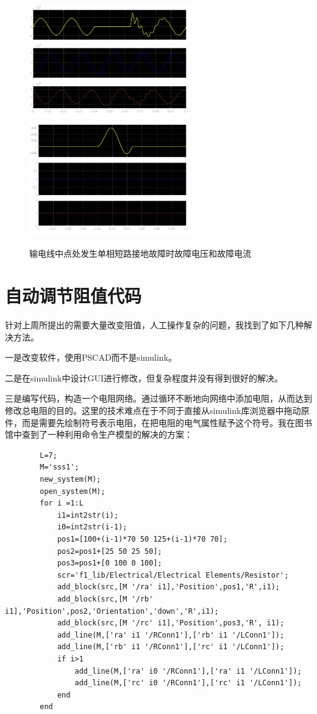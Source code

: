 \documentclass{article}
\begin{document}
{	\begin{figure}[htpb]
		\centering
		\includegraphics[width=7cm]{figure/Uf.png}
		\includegraphics[width=7cm]{figure/if.png}
		\caption{输电线中点处发生单相短路接地故障时故障电压和故障电流}
	\end{figure}
	
	\section{自动调节阻值代码}
	
	针对上周所提出的需要大量改变阻值，人工操作复杂的问题，我找到了如下几种解决方法。
	
	一是改变软件，使用PSCAD而不是simulink。
	
	二是在simulink中设计GUI进行修改，但复杂程度并没有得到很好的解决。
	
	三是编写代码，构造一个电阻网络。通过循环不断地向网络中添加电阻，从而达到修改总电阻的目的。这里的技术难点在于不同于直接从simulink库浏览器中拖动原件，而是需要先绘制符号表示电阻，在把电阻的电气属性赋予这个符号。我在图书馆中查到了一种利用命令生产模型的解决的方案：
	\begin{lstlisting}
		L=7;
		M='sss1';
		new_system(M);
		open_system(M);
		for i =1:L
			i1=int2str(i);
			i0=int2str(i-1);
			pos1=[100+(i-1)*70 50 125+(i-1)*70 70];
			pos2=pos1+[25 50 25 50];
			pos3=pos1+[0 100 0 100];
			scr='f1_lib/Electrical/Electrical Elements/Resistor';
			add_block(src,[M '/ra' i1],'Position',pos1,'R',i1);
			add_block(src,[M '/rb' i1],'Position',pos2,'Orientation','down','R',i1);
			add_block(src,[M '/rc' i1],'Position',pos3,'R', i1);
			add_line(M,['ra' i1 '/RConn1'],['rb' i1 '/LConn1']);
			add_line(M,['rb' i1 '/RConn1'],['rc' i1 '/LConn1']);
			if i>1
				add_line(M,['ra' i0 '/RConn1'],['ra' i1 '/LConn1']);
				add_line(M,['rc' i0 '/RConn1'],['rc' i1 '/LConn1']);
			end
		end
	\end{lstlisting}

}
\end{document}
